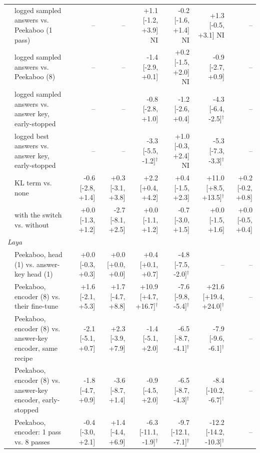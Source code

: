 \begin{table}[tbp]
{\begin{tabular}{llrrrrrr}
 & logged sampled answers vs. Peekaboo (1 pass) & -- & -- & +1.1 {\scriptsize[-1.2, +3.9]} NI & -0.2 {\scriptsize[-1.6, +1.4]} NI & +1.3 {\scriptsize[-0.5, +3.1]} NI & -- \\
 & logged sampled answers vs. Peekaboo (8) & -- & -- & -1.4 {\scriptsize[-2.9, +0.1]} & +0.2 {\scriptsize[-1.5, +2.0]} NI & -0.9 {\scriptsize[-2.7, +0.9]} & -- \\
 & logged sampled answers vs. answer key, early-stopped & -- & -- & -0.8 {\scriptsize[-2.8, +1.0]} & -1.2 {\scriptsize[-2.6, +0.4]} & -4.3 {\scriptsize[-6.4, -2.5]}$^{\dagger}$ & -- \\
 & logged best answers vs. answer key, early-stopped & -- & -- & -3.3 {\scriptsize[-5.5, -1.2]}$^{\dagger}$ & +1.0 {\scriptsize[-0.3, +2.4]} NI & -5.3 {\scriptsize[-7.3, -3.3]}$^{\dagger}$ & -- \\
 & KL term vs. none & -0.6 {\scriptsize[-2.8, +1.4]} & +0.3 {\scriptsize[-3.1, +3.8]} & +2.2 {\scriptsize[+0.4, +4.2]} & +0.4 {\scriptsize[-1.5, +2.3]} & +11.0 {\scriptsize[+8.5, +13.5]}$^{\dagger}$ & +0.2 {\scriptsize[-0.2, +0.8]} \\
 & with the switch vs. without & +0.0 {\scriptsize[-1.3, +1.2]} & -2.7 {\scriptsize[-8.1, +2.5]} & +0.0 {\scriptsize[-1.1, +1.2]} & -0.7 {\scriptsize[-3.0, +1.5]} & +0.0 {\scriptsize[-1.5, +1.6]} & +0.0 {\scriptsize[-0.5, +0.4]} \\
\midrule
\multicolumn{8}{l}{\textit{Laya}} \\
 & Peekaboo, head (1) vs. answer-key head (1) & +0.0 {\scriptsize[-0.3, +0.3]} & +0.0 {\scriptsize[+0.0, +0.0]} & +0.4 {\scriptsize[+0.1, +0.7]} & -4.8 {\scriptsize[-7.5, -2.0]}$^{\dagger}$ & -- & -- \\
 & Peekaboo, encoder (8) vs. their fine-tune & +1.6 {\scriptsize[-2.1, +5.3]} & +1.7 {\scriptsize[-4.7, +8.8]} & +10.9 {\scriptsize[+4.7, +16.7]}$^{\dagger}$ & -7.6 {\scriptsize[-9.8, -5.4]}$^{\dagger}$ & +21.6 {\scriptsize[+19.4, +24.0]}$^{\dagger}$ & -- \\
 & Peekaboo, encoder (8) vs. answer-key encoder, same recipe & -2.1 {\scriptsize[-5.1, +0.7]} & +2.3 {\scriptsize[-3.9, +7.9]} & -1.4 {\scriptsize[-5.1, +2.0]} & -6.5 {\scriptsize[-8.7, -4.1]}$^{\dagger}$ & -7.9 {\scriptsize[-9.6, -6.1]}$^{\dagger}$ & -- \\
 & Peekaboo, encoder (8) vs. answer-key encoder, early-stopped & -1.8 {\scriptsize[-4.7, +0.9]} & -3.6 {\scriptsize[-8.7, +1.4]} & -0.9 {\scriptsize[-4.5, +2.0]} & -6.5 {\scriptsize[-8.7, -4.3]}$^{\dagger}$ & -8.4 {\scriptsize[-10.2, -6.7]}$^{\dagger}$ & -- \\
 & Peekaboo, encoder: 1 pass vs. 8 passes & -0.4 {\scriptsize[-3.0, +2.1]} & +1.4 {\scriptsize[-4.4, +6.9]} & -6.3 {\scriptsize[-11.1, -1.9]}$^{\dagger}$ & -9.7 {\scriptsize[-12.1, -7.1]}$^{\dagger}$ & -12.2 {\scriptsize[-14.2, -10.3]}$^{\dagger}$ & -- \\
\bottomrule
\end{tabular}}
\end{table}
